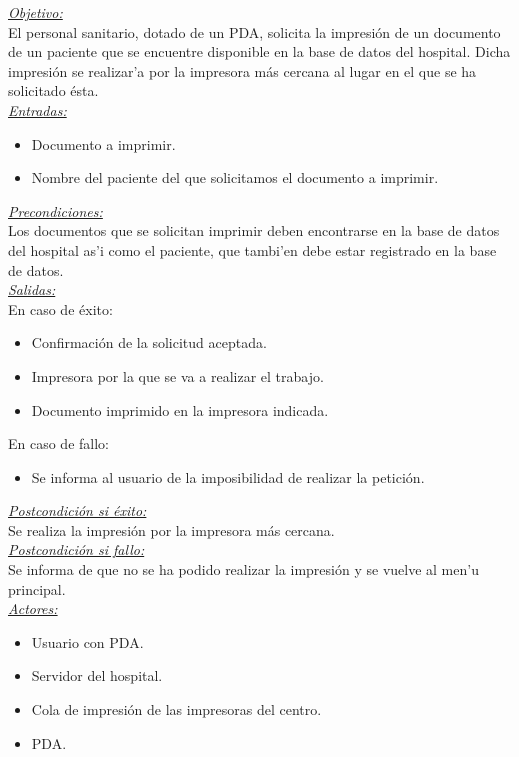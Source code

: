 \emph{\underline{Objetivo:}}\\

El personal sanitario, dotado de un PDA, solicita la impresi\'on de un documento de un paciente que se encuentre disponible en la base de datos del hospital. Dicha impresi\'on se realizar'a por la impresora m\'as cercana al lugar en el que se ha solicitado \'esta.\\

\emph{\underline{Entradas:}} 
\begin{itemize}
\item Documento a imprimir.
\item Nombre del paciente del que solicitamos el documento a imprimir.
\end{itemize}

\emph{\underline{Precondiciones:}}\\

Los documentos que se solicitan imprimir deben encontrarse en la base de datos del hospital as'i como el paciente, que tambi'en debe estar registrado en la base de datos.\\

\emph{\underline{Salidas:}}\\

En caso de \'exito: 
\begin{itemize}
	\item Confirmaci\'on de la solicitud aceptada.
	\item Impresora por la que se va a realizar el trabajo.
	\item Documento imprimido en la impresora indicada.
\end{itemize}
En caso de fallo: 
\begin{itemize}
	\item Se informa al usuario de la imposibilidad de realizar la petici\'on.
\end{itemize}


\emph{\underline{Postcondici\'on si \'exito:}}\\

Se realiza la impresi\'on por la impresora m\'as cercana.\\

\emph{\underline{Postcondici\'on si fallo:}}\\

Se informa de que no se ha podido realizar la impresi\'on y se vuelve al men'u principal.\\

\emph{\underline{Actores: }}
\begin{itemize}
\item Usuario con PDA.
\item Servidor del hospital.
\item Cola de impresi\'on de las impresoras del centro.
\item PDA.
\end{itemize}

